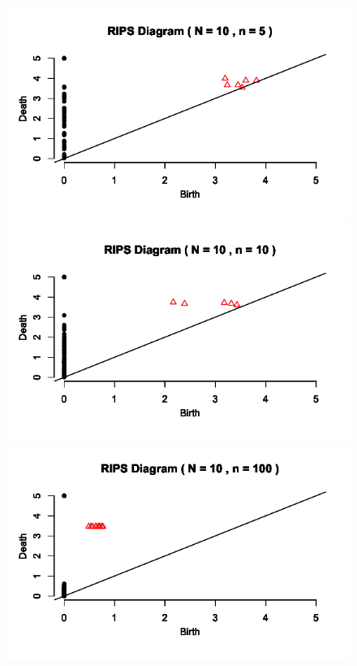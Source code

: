 \documentclass[a4paper]{article}
\begin{document}
\begin{figure}[!htb]
  \includegraphics[width=\linewidth]{RIPS_5n.png}
\endminipage\hfill
{}
  \includegraphics[width=\linewidth]{RIPS_10n.png}
\endminipage\hfill
{}
  \includegraphics[width=\linewidth]{RIPS_n100.png}

\end{figure}
\end{document}
